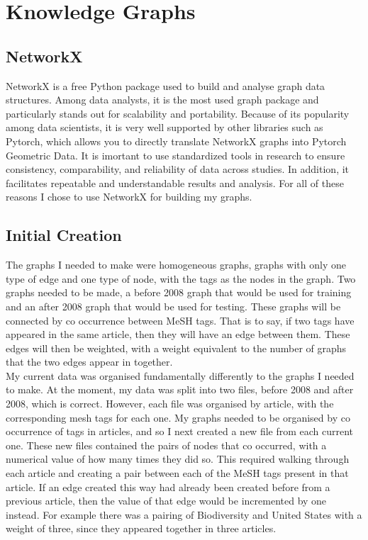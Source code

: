 \documentclass{l4proj}
\begin{document}
\section{Knowledge Graphs}

\subsection{NetworkX}

NetworkX is a free Python package used to build and analyse graph data structures. Among data analysts, it is the most used graph package and particularly stands out for scalability and portability. Because of its popularity among data scientists, it is very well supported by other libraries such as Pytorch, which allows you to directly translate NetworkX graphs into Pytorch Geometric Data. It is imortant to use standardized tools in research to ensure consistency, comparability, and reliability of data across studies. In addition, it  facilitates repeatable and understandable results and analysis. For all of these reasons I chose to use NetworkX for building my graphs. \\

\subsection{Initial Creation}

The graphs I needed to make were homogeneous graphs, graphs with only one type of edge and one type of node, with the tags as the nodes in the graph. Two graphs needed to be made, a before 2008 graph that would be used for training and an after 2008 graph that would be used for testing. These graphs will be connected by co occurrence between MeSH tags. That is to say, if two tags have appeared in the same article, then they will have an edge between them. These edges will then be weighted, with a weight equivalent to the number of graphs that the two edges appear in together. \\

My current data was organised fundamentally differently to the graphs I needed to make. At the moment, my data was split into two files, before 2008 and after 2008, which is correct. However, each file was organised by article, with the corresponding mesh tags for each one. My graphs needed to be organised by co occurrence of tags in articles, and so I next created a new file from each current one. These new files contained the pairs of nodes that co occurred, with a numerical value of how many times they did so. This required walking through each article and creating a pair between each of the MeSH tags present in that article. If an edge created this way had already been created before from a previous article, then the value of that edge would be incremented by one instead. For example there was a pairing of Biodiversity and United States with a weight of three, since they appeared together in three articles. \\
\end{document}
